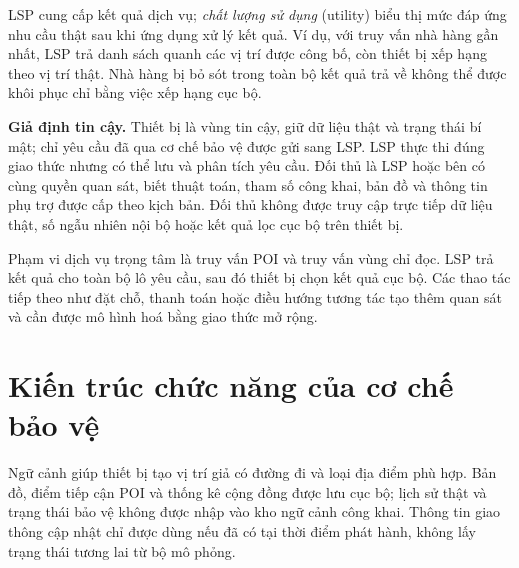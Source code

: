 \documentclass[12pt,a4paper,oneside]{report}
\begin{document}
LSP cung cấp kết quả dịch vụ; \emph{chất lượng sử dụng} (utility) biểu thị mức đáp ứng nhu cầu thật sau khi ứng dụng xử lý kết quả. Ví dụ, với truy vấn nhà hàng gần nhất, LSP trả danh sách quanh các vị trí được công bố, còn thiết bị xếp hạng theo vị trí thật. Nhà hàng bị bỏ sót trong toàn bộ kết quả trả về không thể được khôi phục chỉ bằng việc xếp hạng cục bộ.

\noindent\textbf{Giả định tin cậy.}
Thiết bị là vùng tin cậy, giữ dữ liệu thật và trạng thái bí mật; chỉ yêu cầu đã qua cơ chế bảo vệ được gửi sang LSP. LSP thực thi đúng giao thức nhưng có thể lưu và phân tích yêu cầu. Đối thủ là LSP hoặc bên có cùng quyền quan sát, biết thuật toán, tham số công khai, bản đồ và thông tin phụ trợ được cấp theo kịch bản. Đối thủ không được truy cập trực tiếp dữ liệu thật, số ngẫu nhiên nội bộ hoặc kết quả lọc cục bộ trên thiết bị.

Phạm vi dịch vụ trọng tâm là truy vấn POI và truy vấn vùng chỉ đọc. LSP trả kết quả cho toàn bộ lô yêu cầu, sau đó thiết bị chọn kết quả cục bộ. Các thao tác tiếp theo như đặt chỗ, thanh toán hoặc điều hướng tương tác tạo thêm quan sát và cần được mô hình hoá bằng giao thức mở rộng.

\section{Kiến trúc chức năng của cơ chế bảo vệ}

Ngữ cảnh giúp thiết bị tạo vị trí giả có đường đi và loại địa điểm phù hợp. Bản đồ, điểm tiếp cận POI và thống kê cộng đồng được lưu cục bộ; lịch sử thật và trạng thái bảo vệ không được nhập vào kho ngữ cảnh công khai. Thông tin giao thông cập nhật chỉ được dùng nếu đã có tại thời điểm phát hành, không lấy trạng thái tương lai từ bộ mô phỏng.
\end{document}
